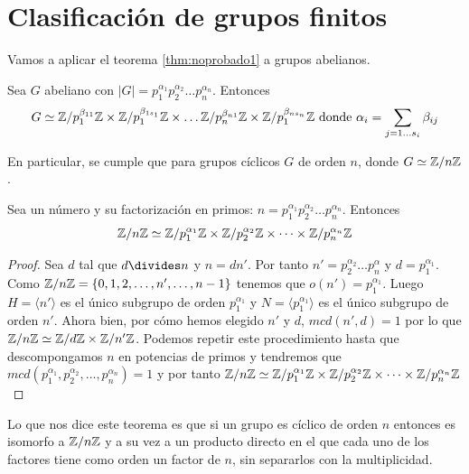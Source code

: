 \section{Clasificación de grupos finitos}

Vamos a aplicar el teorema \ref{thm:noprobado1} a grupos abelianos.

\begin{thm}
	Sea $G$ abeliano con $|G| = p_1^{\alpha_1}p_2^{\alpha_2}\dots p_n^{\alpha_n}$. Entonces
	\begin{align}
	G \simeq \mathbb{Z}/p_1^{\beta_{11}}\mathbb{Z} \times \mathbb{Z}/p_1^{\beta_{1s_1}}\mathbb{Z} \times \dots \mathbb{Z}/p_n^{\beta_{n1}}\mathbb{Z} \times \mathbb{Z}/p_1^{\beta_{ns_n}}\mathbb{Z} \text{ donde } \alpha_i = \sum_{j = 1\dots s_i} \beta_{ij}
	\end{align}
\end{thm}

En particular, se cumple que para grupos cíclicos $G$ de orden $n$, donde $G \simeq \mathbb{Z}/n\mathbb{Z}$.

\begin{thm}
	\label{thm:znzisomproductodirecto}
	Sea un número y su factorización en primos: $n = p_1^{\alpha_1}p_2^{\alpha_2}\dots p_n^{\alpha_n}$. Entonces
	\begin{align}
	\mathbb{Z}/n\mathbb{Z} \simeq \mathbb{Z}/p_1^{\alpha_1}\mathbb{Z} \times \mathbb{Z}/p_2^{\alpha_2}\mathbb{Z} \times \dots \times \mathbb{Z}/p_n^{\alpha_n}\mathbb{Z}
	\end{align}
\end{thm}

\begin{proof}
	Sea $d$ tal que $d \divides n$ y $n = dn'$. Por tanto $n' = p_2^{\alpha_2}\dots p_n^{\alpha}$ y $d = p_1^{\alpha_1}$. Como $\mathbb{Z}/n\mathbb{Z} = \{0, 1, 2, \dots, n', \dots, n-1\}$ tenemos que $o(n') = p_1^{\alpha_1}$. Luego $H = \langle n' \rangle$ es el único subgrupo de orden $p_1^{\alpha_1}$ y $N = \langle p_1^{\alpha_1} \rangle$ es el único subgrupo de orden $n'$. Ahora bien, por cómo hemos elegido $n'$ y $d$, $mcd(n', d) = 1$ por lo que $\mathbb{Z}/n\mathbb{Z} \simeq \mathbb{Z}/d\mathbb{Z} \times \mathbb{Z}/n'\mathbb{Z}$. Podemos repetir este procedimiento hasta que descompongamos $n$ en potencias de primos y tendremos que $mcd(p_1^{\alpha_1}, p_2^{\alpha_2}, \dots, p_n^{\alpha_n}) = 1$ y por tanto $\mathbb{Z}/n\mathbb{Z} \simeq \mathbb{Z}/p_1^{\alpha_1}\mathbb{Z} \times \mathbb{Z}/p_2^{\alpha_2}\mathbb{Z} \times \dots \times \mathbb{Z}/p_n^{\alpha_n}\mathbb{Z}$
\end{proof}

Lo que nos dice este teorema es que si un grupo es cíclico de orden $n$ entonces es isomorfo a $\mathbb{Z}/n\mathbb{Z}$ y a su vez a un producto directo en el que cada uno de los factores tiene como orden un factor de $n$, sin separarlos con la multiplicidad.

